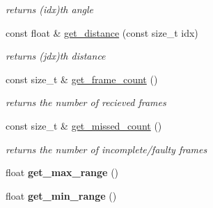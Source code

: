 \begin{DoxyCompactItemize}
\begin{DoxyCompactList}\small\item\em returns (idx)th angle \end{DoxyCompactList}\item 
\hypertarget{classhokuyo_1_1tcp__client_ab36272194ed32fa9c96a89d80cb85fb0}{const float \& \hyperlink{classhokuyo_1_1tcp__client_ab36272194ed32fa9c96a89d80cb85fb0}{get\-\_\-distance} (const size\-\_\-t idx)}\label{classhokuyo_1_1tcp__client_ab36272194ed32fa9c96a89d80cb85fb0}

\begin{DoxyCompactList}\small\item\em returns (jdx)th distance \end{DoxyCompactList}\item 
\hypertarget{classhokuyo_1_1tcp__client_af9932c00ecbaede65b6a1cd60073e28c}{const size\-\_\-t \& \hyperlink{classhokuyo_1_1tcp__client_af9932c00ecbaede65b6a1cd60073e28c}{get\-\_\-frame\-\_\-count} ()}\label{classhokuyo_1_1tcp__client_af9932c00ecbaede65b6a1cd60073e28c}

\begin{DoxyCompactList}\small\item\em returns the number of recieved frames \end{DoxyCompactList}\item 
\hypertarget{classhokuyo_1_1tcp__client_aa6e3e44f43147facd7414f9f0e03fc61}{const size\-\_\-t \& \hyperlink{classhokuyo_1_1tcp__client_aa6e3e44f43147facd7414f9f0e03fc61}{get\-\_\-missed\-\_\-count} ()}\label{classhokuyo_1_1tcp__client_aa6e3e44f43147facd7414f9f0e03fc61}

\begin{DoxyCompactList}\small\item\em returns the number of incomplete/faulty frames \end{DoxyCompactList}\item 
\hypertarget{classhokuyo_1_1tcp__client_a6049b6fc4e800b0b580d5ce32f95e5b3}{float {\bfseries get\-\_\-max\-\_\-range} ()}\label{classhokuyo_1_1tcp__client_a6049b6fc4e800b0b580d5ce32f95e5b3}

\item 
\hypertarget{classhokuyo_1_1tcp__client_acb30c8e726535bc5467675fbeedfa4cd}{float {\bfseries get\-\_\-min\-\_\-range} ()}\label{classhokuyo_1_1tcp__client_acb30c8e726535bc5467675fbeedfa4cd}


\end{DoxyCompactItemize}
